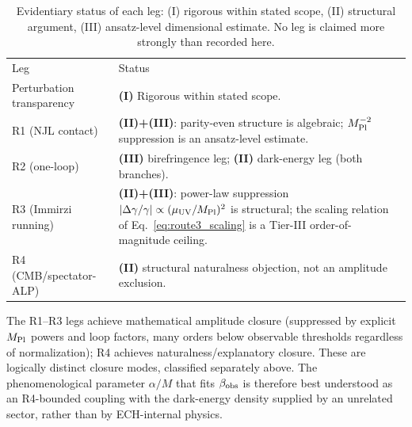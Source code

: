 \documentclass[aps,prd,twocolumn,superscriptaddress,preprintnumbers,nofootinbib,longbibliography,floatfix]{revtex4-2}
\newcommand{\MPl}{M_{\rm Pl}}
\begin{document}
\begin{table}[tb]
\caption{\label{tab:evidentiary_status} Evidentiary status of each leg: (I)
rigorous within stated scope, (II) structural argument, (III)
ansatz-level dimensional estimate. No leg is claimed more strongly than
recorded here.}
\centering
\begin{ruledtabular}
\begin{tabular}{ll}
Leg & Status \\
\colrule
\parbox[t]{0.20\textwidth}{Perturbation\\transparency} &
\parbox[t]{0.65\textwidth}{\raggedright \textbf{(I)} Rigorous within
stated scope.} \\[4pt]
\parbox[t]{0.20\textwidth}{R1 (NJL contact)} &
\parbox[t]{0.65\textwidth}{\raggedright \textbf{(II)+(III)}: parity-even
structure is algebraic; $\MPl^{-2}$ suppression is an ansatz-level
estimate.} \\[4pt]
\parbox[t]{0.20\textwidth}{R2 (one-loop)} &
\parbox[t]{0.65\textwidth}{\raggedright \textbf{(III)} birefringence leg;
\textbf{(II)} dark-energy leg (both branches).} \\[4pt]
\parbox[t]{0.20\textwidth}{R3 (Immirzi running)} &
\parbox[t]{0.65\textwidth}{\raggedright \textbf{(II)+(III)}:
power-law suppression $|\Delta\gamma/\gamma|\propto(\mu_{\rm UV}/\MPl)^2$
is structural; the scaling relation of Eq.~\eqref{eq:route3_scaling} is
a Tier-III order-of-magnitude ceiling.} \\[4pt]
\parbox[t]{0.20\textwidth}{R4 (CMB/spectator-ALP)} &
\parbox[t]{0.65\textwidth}{\raggedright \textbf{(II)} structural
naturalness objection, not an amplitude exclusion.} \\
\end{tabular}
\end{ruledtabular}
\end{table}

The R1--R3 legs achieve mathematical amplitude closure (suppressed by
explicit $\MPl$ powers and loop factors, many orders below observable
thresholds regardless of normalization); R4 achieves
naturalness/explanatory closure. These are logically distinct closure
modes, classified separately above. The phenomenological parameter
$\alpha/M$ that fits $\beta_{\rm obs}$ is therefore best understood as an
R4-bounded coupling with the dark-energy density supplied by an unrelated
sector, rather than by ECH-internal physics.
\end{document}
